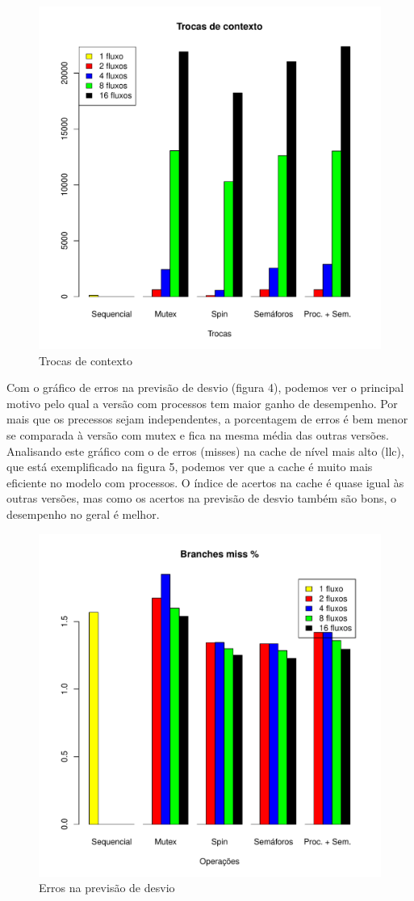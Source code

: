 \documentclass[12pt]{article}
\begin{document}
\begin{figure}[ht]
\centering
\includegraphics[width=.6\textwidth]{b_ctx.pdf}
\caption{Trocas de contexto}
\label{fig:trocadecontexto}
\end{figure}

Com o gráfico de erros na previsão de desvio (figura 4), podemos ver o principal motivo pelo qual a versão com processos tem maior ganho de desempenho. Por mais que os precessos sejam independentes, a porcentagem de erros é bem menor se comparada à versão com mutex e fica na mesma média das outras versões. Analisando este gráfico com o de erros (misses) na cache de nível mais alto (llc), que está exemplificado na figura 5, podemos ver que a cache é muito mais eficiente no modelo com processos. O índice de acertos na cache é quase igual às outras versões, mas como os acertos na previsão de desvio também são bons, o desempenho no geral é melhor.

\begin{figure}[ht]
\centering
\includegraphics[width=.6\textwidth]{b_bm.pdf}
\caption{Erros na previsão de desvio}
\label{fig:desvios}
\end{figure}
\end{document}
